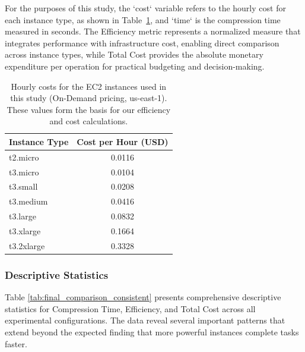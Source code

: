 \documentclass[conference]{IEEEtran}
\begin{document}
	For the purposes of this study, the `cost` variable refers to the hourly cost for each instance type, as shown in Table~\ref{tab:instance_costs}, and `time` is the compression time measured in seconds. The Efficiency metric represents a normalized measure that integrates performance with infrastructure cost, enabling direct comparison across instance types, while Total Cost provides the absolute monetary expenditure per operation for practical budgeting and decision-making.
	
	\begin{table}[htbp]
		\centering
		\caption{Hourly costs for the EC2 instances used in this study (On-Demand pricing, us-east-1). These values form the basis for our efficiency and cost calculations.}
		\label{tab:instance_costs}
		\begin{tabular}{lc}
			\toprule
			Instance Type & Cost per Hour (USD) \\
			\midrule
			t2.micro      & 0.0116                      \\
			t3.micro      & 0.0104                      \\
			t3.small      & 0.0208                      \\
			t3.medium     & 0.0416                      \\
			t3.large      & 0.0832                      \\
			t3.xlarge     & 0.1664                      \\
			t3.2xlarge    & 0.3328                      \\
			\bottomrule
		\end{tabular}
	\end{table}
	
	\subsubsection{Descriptive Statistics}
	
	Table \ref{tab:final_comparison_consistent} presents comprehensive descriptive statistics for Compression Time, Efficiency, and Total Cost across all experimental configurations. The data reveal several important patterns that extend beyond the expected finding that more powerful instances complete tasks faster.
	
\end{document}
